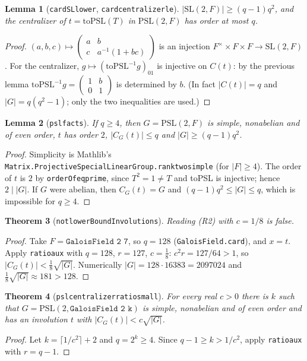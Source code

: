 \documentclass[11pt]{article}
\newtheorem{theorem}{Theorem}
\newtheorem{lemma}[theorem]{Lemma}
\theoremstyle{definition}
\theoremstyle{remark}
\renewcommand{\_}{\oldus\allowbreak}
\begin{document}
\begin{lemma}[\texttt{card\_SL\_lower}, \texttt{card\_centralizer\_le}]
$|\mathrm{SL}(2,F)|\ge(q-1)q^2$, and the centralizer of $t=\mathrm{toPSL}(T)$ in $\mathrm{PSL}(2,F)$ has order
at most $q$.
\end{lemma}
\begin{proof}
$(a,b,c)\mapsto\begin{pmatrix}a&b\\c&a^{-1}(1+bc)\end{pmatrix}$ is an injection $F^\times\times F\times F\to
\mathrm{SL}(2,F)$. For the centralizer, $g\mapsto(\mathrm{toPSL}^{-1}g)_{01}$ is injective on $C(t)$: by the
previous lemma $\mathrm{toPSL}^{-1}g=\begin{pmatrix}1&b\\0&1\end{pmatrix}$ is determined by $b$. (In fact
$|C(t)|=q$ and $|G|=q(q^2-1)$; only the two inequalities are used.)
\end{proof}

\begin{lemma}[\texttt{psl\_facts}]
If $q\ge4$, then $G=\mathrm{PSL}(2,F)$ is simple, nonabelian and of even order, $t$ has order $2$,
$|C_G(t)|\le q$ and $|G|\ge(q-1)q^2$.
\end{lemma}
\begin{proof}
Simplicity is Mathlib's \texttt{Matrix.ProjectiveSpecialLinearGroup.rank\_two\_simple} (for $|F|\ge4$). The
order of $t$ is $2$ by \texttt{orderOf\_eq\_prime}, since $T^2=1\ne T$ and toPSL is injective; hence $2\mid|G|$.
If $G$ were abelian, then $C_G(t)=G$ and $(q-1)q^2\le|G|\le q$, which is impossible for $q\ge4$.
\end{proof}

\begin{theorem}[\texttt{not\_lowerBoundInvolutions}]
Reading (R2) with $c=1/8$ is false.
\end{theorem}
\begin{proof}
Take $F=\texttt{GaloisField 2 7}$, so $q=128$ (\texttt{GaloisField.card}), and $x=t$. Apply
\texttt{ratio\_aux} with $q=128$, $r=127$, $c=\tfrac18$: $c^2r=127/64>1$, so
$|C_G(t)|<\tfrac18\sqrt{|G|}$. Numerically $|G|=128\cdot16383=2097024$ and $\tfrac18\sqrt{|G|}\approx181>128$.
\end{proof}

\begin{theorem}[\texttt{psl\_centralizer\_ratio\_small}]
For every real $c>0$ there is $k$ such that $G=\mathrm{PSL}(2,\texttt{GaloisField 2 k})$ is simple, nonabelian
and of even order and has an involution $t$ with $|C_G(t)|<c\sqrt{|G|}$.
\end{theorem}
\begin{proof}
Let $k=\lceil1/c^2\rceil+2$ and $q=2^k\ge4$. Since $q-1\ge k>1/c^2$, apply \texttt{ratio\_aux} with $r=q-1$.
\end{proof}
\end{document}
